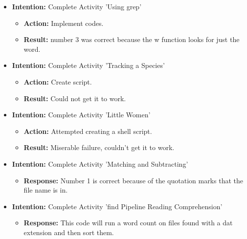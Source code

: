\documentclass{article}
\begin{document}
\date{06/09/2019 8:00}
\begin{itemize}

\item{\textbf{Intention:} Complete Activity 'Using grep'}

\begin{itemize}
\item{\textbf{Action:} Implement codes.}

\item{\textbf{Result:} number 3 was correct because the w function looks for just the word.}

\end{itemize}

\item{\textbf{Intention:} Complete Activity 'Tracking a Species'}

\begin{itemize}
\item{\textbf{Action:} Create script.}

\item{\textbf{Result:} Could not get it to work.}

\end{itemize}

\item{\textbf{Intention:} Complete Activity 'Little Women'}

\begin{itemize}
\item{\textbf{Action:} Attempted creating a shell script.}

\item{\textbf{Result:} Miserable failure, couldn't get it to work.}

\end{itemize}


\item{\textbf{Intention:} Complete Activity 'Matching and Subtracting'}

\begin{itemize}
\item{\textbf{Response:} Number 1 is correct because of the quotation marks that the file name is in.}

\end{itemize}

\item{\textbf{Intention:} Complete Activity 'find Pipeline Reading Comprehension'}

\begin{itemize}
\item{\textbf{Response:} This code will run a word count on files found with a dat extension and then sort them.}




\end{itemize}
\end{itemize}
\end{document}
